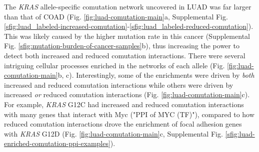 \documentclass[english, 12pt, letterpaper]{article}
\newcommand{\KRAS}{\emph{KRAS}}
\begin{document}

The \KRAS{} allele-specific comutation network uncovered in LUAD was far larger than that of COAD (Fig. \ref{fig:luad-comutation-main}a, Supplemental Fig. \ref{sfig:luad_labeled-increased-comutation}-\ref{sfig:luad_labeled-reduced-comutation}).
This was likely caused by the higher mutation rate in this cancer (Supplemental Fig. \ref{sfig:mutation-burden-of-cancer-samples}b), thus increasing the power to detect both increased and reduced comutation interactions.
There were several intriguing cellular processes enriched in the networks of each allele (Fig. \ref{fig:luad-comutation-main}b, c).
Interestingly, some of the enrichments were driven by \emph{both} increased and reduced comutation interactions while others were driven by increased \emph{or} reduced comutation interactions (Fig. \ref{fig:luad-comutation-main}c).
For example, \KRAS{} G12C had increased and reduced comutation interactions with many genes that interact with Myc ("PPI of MYC (TF)"), compared to how reduced comutation interactions drove the enrichment of focal adhesion genes with \KRAS{} G12D (Fig. \ref{fig:luad-comutation-main}c, Supplemental Fig. \ref{sfig:luad-enriched-comutation-ppi-examples}).
\end{document}
